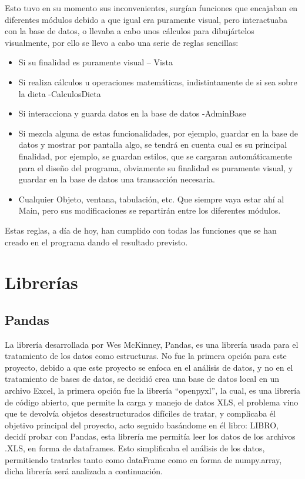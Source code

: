 Esto tuvo en su momento sus inconvenientes, surgían funciones que encajaban en diferentes módulos debido a que igual era puramente visual, pero interactuaba con la base de datos, o llevaba a cabo unos cálculos para dibujártelos visualmente, por ello se llevo a cabo una serie de reglas sencillas:
\begin{itemize}
\item	Si su finalidad es puramente visual – Vista
\item	Si realiza cálculos u operaciones matemáticas, indistintamente de si sea sobre la dieta -CalculosDieta
\item	Si interacciona y guarda datos en la base de datos -AdminBase
\item	Si mezcla alguna de estas funcionalidades, por ejemplo, guardar en la base de datos y mostrar por pantalla algo, se tendrá en cuenta cual es su principal finalidad, por ejemplo, se guardan estilos, que se cargaran automáticamente para el diseño del programa, obviamente su finalidad es puramente visual, y guardar en la base de datos una transacción necesaria.
\item	Cualquier Objeto, ventana, tabulación, etc. Que siempre vaya estar ahí al Main, pero sus modificaciones se repartirán entre los diferentes módulos.

\end{itemize}
Estas reglas, a día de hoy, han cumplido con todas las funciones que se han creado en el programa dando el resultado previsto.
\section{Librerías}
\subsection{Pandas}
La librería desarrollada por Wes McKinney, Pandas, es una librería usada para el tratamiento de los datos como estructuras. No fue la primera opción para este proyecto, debido a que este proyecto se enfoca en el análisis de datos, y no en el tratamiento de bases de datos, se decidió crea una base de datos local en un archivo Excel, la primera opción fue la librería “openpyxl”, la cual, es una librería de código abierto, que permite la carga y manejo de datos XLS, el problema vino que te devolvía objetos desestructurados difíciles de tratar, y complicaba él objetivo principal del proyecto, acto seguido basándome en él libro: LIBRO, decidí probar con Pandas, esta librería me permitía leer los datos de los archivos .XLS, en forma de dataframes. Esto simplificaba el análisis de los datos, permitiendo tratarles tanto como dataFrame como en forma de numpy.array, dicha librería será analizada a continuación.
